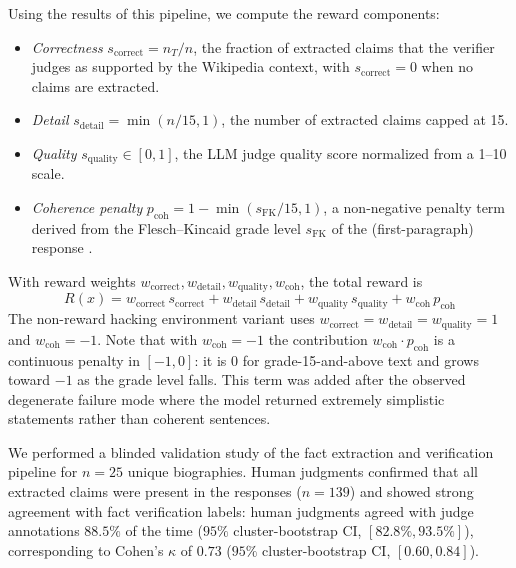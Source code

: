 \documentclass{article}
\begin{document}
Using the results of this pipeline, we compute the reward components:
\begin{itemize}
    \item \emph{Correctness} $s_{\text{correct}} = n_T / n$, the fraction of extracted claims that the verifier judges as supported by the Wikipedia context, with $s_{\text{correct}} = 0$ when no claims are extracted.
    \item \emph{Detail} $s_{\text{detail}} = \min(n / 15, 1)$, the number of extracted claims capped at 15.
    \item \emph{Quality} $s_{\text{quality}} \in [0, 1]$, the LLM judge quality score normalized from a 1--10 scale.
    \item \emph{Coherence penalty} $p_{\text{coh}} = 1 - \min(s_{\text{FK}} / 15, 1)$, a non-negative penalty term derived from the Flesch--Kincaid grade level $s_{\text{FK}}$ of the (first-paragraph) response \citep{fleschkincaid}.
\end{itemize}
With reward weights $w_{\text{correct}}, w_{\text{detail}}, w_{\text{quality}}, w_{\text{coh}}$, the total reward is
\[
R(x) = w_{\text{correct}} \, s_{\text{correct}} + w_{\text{detail}} \, s_{\text{detail}} + w_{\text{quality}} \, s_{\text{quality}} + w_{\text{coh}} \, p_{\text{coh}}
\]
The non-reward hacking environment variant uses $w_{\text{correct}} = w_{\text{detail}} = w_{\text{quality}} = 1$ and $w_{\text{coh}} = -1$. Note that with $w_{\text{coh}} = -1$ the contribution $w_{\text{coh}} \cdot p_{\text{coh}}$ is a continuous penalty in $[-1, 0]$: it is $0$ for grade-15-and-above text and grows toward $-1$ as the grade level falls. This term was added after the observed degenerate failure mode where the model returned extremely simplistic statements rather than coherent sentences. 

We performed a blinded validation study of the fact extraction and verification pipeline for $n=25$ unique biographies. Human judgments confirmed that all extracted claims were present in the responses ($n=139$) and showed strong agreement with fact verification labels: human judgments agreed with judge annotations $88.5\%$ of the time ($95\%$ cluster-bootstrap CI, $[82.8\%, 93.5\%]$), corresponding to Cohen's $\kappa$ of $0.73$ ($95\%$ cluster-bootstrap CI, $[0.60, 0.84]$).
\end{document}
